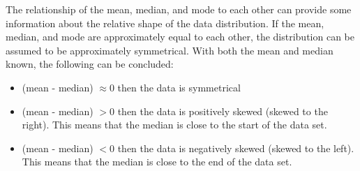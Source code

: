 The relationship of the mean, median, and mode to each other can provide some information about the relative shape of the data distribution. If the mean, median, and mode are approximately equal to each other, the distribution can be assumed to be approximately symmetrical.
With both the mean and median known, the following can be concluded:
\begin{itemize}
\item (mean - median) $\approx 0$ then the data is symmetrical 
\item (mean - median) $>0$ then the data is positively skewed (skewed to the right). This means that the median is close to the start of the data set.
\item (mean - median) $<0$ then the data is negatively skewed (skewed to the left). This means that the median is close to the end of the data set.
\end{itemize}

